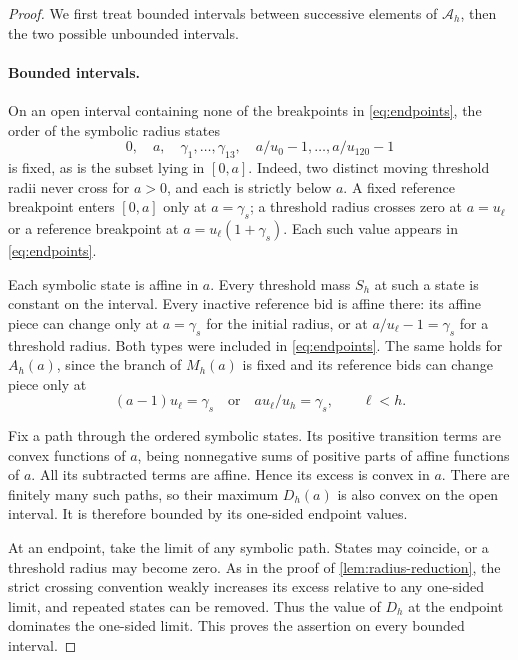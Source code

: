 \documentclass[11pt]{article}
\theoremstyle{definition}
\theoremstyle{remark}
\newcommand{\paramset}{\mathcal A}
\begin{document}
\begin{proof}
We first treat bounded intervals between successive elements of
$\paramset_h$, then the two possible unbounded intervals.

\paragraph{Bounded intervals.}
On an open interval containing none of the breakpoints in
\eqref{eq:endpoints}, the order of the symbolic radius states
\[
  0,\quad a,\quad \gamma_1,\ldots,\gamma_{13},\quad
  a/u_0-1,\ldots,a/u_{120}-1
\]
is fixed, as is the subset lying in $[0,a]$. Indeed, two distinct moving
threshold radii never cross for $a>0$, and each is strictly below $a$.
A fixed reference breakpoint enters $[0,a]$ only at $a=\gamma_s$;
a threshold radius crosses zero at $a=u_\ell$ or a reference breakpoint
at $a=u_\ell(1+\gamma_s)$. Each such value appears in
\eqref{eq:endpoints}.

Each symbolic state is affine in $a$. Every threshold mass $S_h$ at such a
state is constant on the interval. Every inactive reference bid is affine
there: its affine piece can change only at $a=\gamma_s$ for the initial
radius, or at $a/u_\ell-1=\gamma_s$ for a threshold radius.
Both types were included in \eqref{eq:endpoints}.
The same holds for $A_h(a)$, since the branch of $M_h(a)$ is fixed and its
reference bids can change piece only at
\[
  (a-1)u_\ell=\gamma_s
  \quad\text{or}\quad a u_\ell/u_h=\gamma_s,
  \qquad \ell<h.
\]

Fix a path through the ordered symbolic states. Its positive transition
terms are convex functions of $a$, being nonnegative sums of positive
parts of affine functions of $a$.
All its subtracted terms are affine. Hence its excess is convex in $a$.
There are finitely many such paths, so their maximum $D_h(a)$ is also
convex on the open interval. It is therefore bounded by its one-sided
endpoint values.

At an endpoint, take the limit of any symbolic path. States may coincide,
or a threshold radius may become zero. As in the proof of
\cref{lem:radius-reduction}, the strict crossing convention weakly
increases its excess relative to any one-sided limit, and repeated states
can be removed. Thus the value of $D_h$ at the endpoint dominates the
one-sided limit. This proves the assertion on every bounded interval.


\end{proof}
\end{document}
